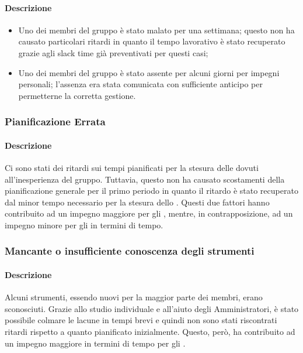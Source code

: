 \paragraph {Descrizione}
\begin{itemize}
	\item Uno dei membri del gruppo è stato malato per una settimana; questo non ha causato particolari ritardi in quanto il tempo lavorativo è stato recuperato grazie agli slack time già preventivati per questi casi;
	\item Uno dei membri del gruppo è stato assente per alcuni giorni per impegni personali; l'assenza era stata comunicata con sufficiente anticipo per permetterne la corretta gestione.
\end{itemize}

\subsubsection{Pianificazione Errata}
\paragraph{Descrizione}
Ci sono stati dei ritardi sui tempi pianificati per la stesura delle \NdP{} dovuti all'inesperienza del gruppo. Tuttavia, questo non ha causato scostamenti della pianificazione generale per il primo periodo in quanto il ritardo è stato recuperato dal minor tempo necessario per la stesura dello \SdF{}. Questi due fattori hanno contribuito ad un impegno maggiore per gli \adms{}, mentre, in contrapposizione, ad un impegno minore per gli \anas{} in termini di tempo.

\subsubsection{Mancante o insufficiente conoscenza degli strumenti}
\paragraph {Descrizione}
Alcuni strumenti, essendo nuovi per la maggior parte dei membri, erano sconosciuti. Grazie allo studio individuale e all'aiuto degli Amministratori, è stato possibile colmare le lacune in tempi brevi e quindi non sono stati riscontrati ritardi rispetto a quanto pianificato inizialmente. Questo, però, ha contribuito ad un impegno maggiore in termini di tempo per gli \adms{}.